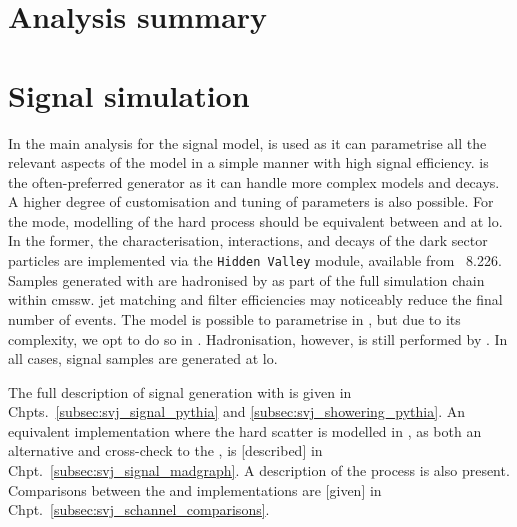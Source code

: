

\section{Analysis summary}
\label{sec:svj_overview}





\section{Signal simulation}
\label{sec:signal_sim}

In the main analysis for the \schannel signal model, \PYTHIA is used as it can parametrise all the relevant aspects of the model in a simple manner with high signal efficiency. \MADGRAPH is the often-preferred generator as it can handle more complex models and decays. A higher degree of customisation and tuning of parameters is also possible. For the \schannel mode, modelling of the hard process should be equivalent between \PYTHIA and \MADGRAPH at \acrshort{lo}. In the former, the characterisation, interactions, and decays of the dark sector particles are implemented via the \texttt{Hidden Valley} module, available from \PYTHIA~8.226. Samples generated with \MADGRAPH are hadronised by \PYTHIA as part of the full simulation chain within \acrshort{cmssw}. \Gls{jet} matching and filter efficiencies may noticeably reduce the final number of events. The \tchannel model is possible to parametrise in \PYTHIA, but due to its complexity, we opt to do so in \MADGRAPH. Hadronisation, however, is still performed by \PYTHIA. In all cases, signal samples are generated at \acrfull{lo}.

The full description of \schannel signal generation with \PYTHIAEIGHT is given in Chpts.~\ref{subsec:svj_signal_pythia} and \ref{subsec:svj_showering_pythia}. An equivalent implementation where the hard scatter is modelled in \MGvATNLO, as both an alternative and cross-check to the \PYTHIA [version], is [described] in Chpt.~\ref{subsec:svj_signal_madgraph}. A description of the \tchannel process is also present. Comparisons between the \PYTHIA and \MADGRAPH implementations are [given] in Chpt.~\ref{subsec:svj_schannel_comparisons}.

